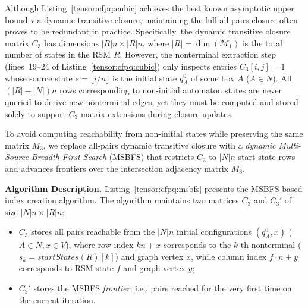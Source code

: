 
\label{sec:msbfs}

Although Listing~\ref{tensor:cfpq:cubic} achieves the best known asymptotic upper bound via dynamic transitive closure, maintaining the full all-pairs closure often proves to be redundant in practice.
Specifically, the dynamic transitive closure matrix $C_3$ has dimensions $|R|n \times |R|n$, where $|R| = \dim(\mathcal{M}_1)$ is the total number of states in the RSM $R$.
However, the nonterminal extraction step (lines~19--24 of Listing~\ref{tensor:cfpq:cubic}) only inspects entries $C_3[i,j] = 1$ whose source state $s = \lfloor i/n \rfloor$ is the initial state $q_A^0$ of some box $A$ ($A \in N$).
All $(|R| - |N|)n$ rows corresponding to non-initial automaton states are never queried to derive new nonterminal edges, yet they must be computed and stored solely to support $C_3$ matrix extensions during closure updates.

To avoid computing reachability from non-initial states while preserving the same matrix $M_3$, we replace all-pairs dynamic transitive closure with a \emph{dynamic Multi-Source Breadth-First Search} (MSBFS) that restricts $C_3$ to $|N|n$ start-state rows and advances frontiers over the intersection adjacency matrix $M_3$.

\textbf{Algorithm Description.}
Listing~\ref{tensor:cfpq:msbfs} presents the MSBFS-based index creation algorithm.
The algorithm maintains two matrices $C_3$ and $C_3'$ of size $|N|n \times |R|n$:
\begin{itemize}
    \item $C_3$ stores all pairs reachable from the $|N|n$ initial configurations $(q_A^0, x)$ ($A \in N, x \in V$), where row index $kn + x$ corresponds to the $k$-th nonterminal ($s_k = \textit{startStates}(R)[k]$) and graph vertex $x$, while column index $f \cdot n + y$ corresponds to RSM state $f$ and graph vertex $y$;
    \item $C_3'$ stores the MSBFS \emph{frontier}, i.e., pairs reached for the very first time on the current iteration.
\end{itemize}

